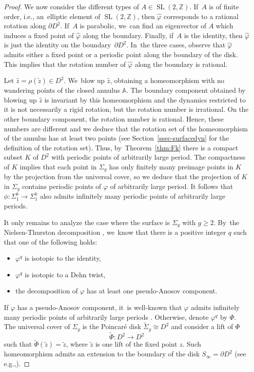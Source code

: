 \documentclass[11pt]{article}
\newcommand{\ie}{i.e.,\xspace}
\newcommand{\eg}{e.g.,\xspace}
\DeclareMathOperator{\SL}{SL}
\theoremstyle{definition}
\begin{document}
\begin{proof}
We now consider the different types of $A\in \SL(2,\mathbb{Z})$. If~$A$ is of finite order, \ie an~elliptic element of $\SL(2,\mathbb{Z})$, then $\widehat \varphi$ corresponds to a rational rotation along $\partial D^2$. If~$A$ is parabolic, we~can find an eigenvector of $A$ which induces a fixed point of $\widehat \varphi$ along the boundary. Finally, if~$A$ is the identity, then $\widehat \varphi$ is just the identity on the boundary~$\partial D^2$. In~the three cases, observe that $\widehat \varphi$ admits either a fixed point or a periodic point along the boundary of the disk. This implies that the rotation number of $\widehat \varphi$ along the boundary is rational.

Let $\hat z=\rho(\widetilde z)\in D^2$. We~blow up $\hat z$, obtaining a homeomorphism with no wandering points of the closed annulus $\mathbb{A}$. The boundary component obtained by blowing up $\hat z$ is invariant by this homeomorphism and the dynamics restricted to it is not necessarily a rigid rotation, but the rotation number is irrational. On the other boundary component, the rotation number is rational. Hence, these numbers are different and we deduce that the rotation set of the homeomorphism of the annulus has at least two points (see Section~\ref{ssec-surfacedyn} for the definition of the rotation set). Thus, by~Theorem~\ref{thm:Fk} there is a compact subset $K$ of $D^2$ with periodic points of arbitrarily large period. The compactness of $K$ implies that each point in $\Sigma_g$ has only finitely many preimage points in $K$ by the projection from the universal cover, so we deduce that the projection of $K$ in $\Sigma_g$ contains periodic points of $\varphi$ of arbitrarily large period. It follows that $\phi:\Sigma_1^b \to \Sigma_1^b$ also admits infinitely many periodic points of arbitrarily large periods.

It only remains to analyze the case where the surface is $\Sigma_g$ with $g \geq 2$. By~the Nielsen-Thurston decomposition \cite{T, FLP}, we~know that there is a positive integer $q$ such that one of the following holds:
\begin{itemize}
\item
$\varphi^q$ is isotopic to the identity,
\item
$\varphi^q$ is isotopic to a Dehn twist,
\item
the decomposition of $\varphi$ has at least one pseudo-Anosov component.
\end{itemize}
If $\varphi$ has a pseudo-Anosov component, it~is well-known that $\varphi$ admits infinitely many periodic points of arbitrarily large periods \cite{Ha}. Otherwise, denote $\varphi^q$ by $\Phi$. The universal cover of $\Sigma_g$ is the Poincaré disk $\widetilde \Sigma_g \cong D^2$ and consider a lift of $\Phi$
\[
\widetilde \Phi: D^2 \to D^2
\]
such that $\widetilde \Phi(\widetilde z)=\widetilde z$, where $\widetilde z$ is one lift of the fixed point $z$. Such homeomorphism admits an extension to the boundary of the disk $S_\infty=\partial D^2$ (see \eg \cite[Cor.\,1.2]{T}).


\end{proof}
\end{document}
